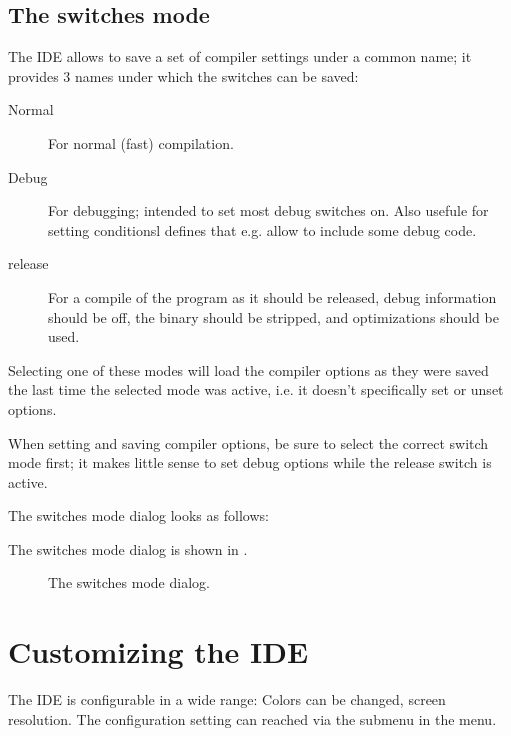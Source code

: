 \subsection{The switches mode}
\label{se:compilermode}
The IDE allows to save a set of compiler settings under a common name; it
provides 3 names under which the switches can be saved:
\begin{description}
\item[Normal] For normal (fast) compilation.
\item[Debug] For debugging; intended to set most debug switches on. Also
usefule for setting conditionsl defines that e.g. allow to include some
debug code.
\item[release] For a compile of the program as it should be released, debug
information should be off, the binary should be stripped, and optimizations
should be used.
\end{description}
Selecting one of these modes will load the compiler options as they were
saved the last time the selected mode was active, i.e. it doesn't
specifically set or unset options. 

When setting and saving compiler options, be sure to select the correct
switch mode first; it makes little sense to set debug options while the
release switch is active.

\begin{htmlonly}
The switches mode dialog looks as follows:
\end{htmlonly}
\begin{latexonly}
The switches mode dialog is shown in .
\begin{figure}[ht]
\begin{center}
\caption{The switches mode dialog.}\label{fig:oswitch}
\ifpdf
{}%
\else
{}%
\fi
\end{center}
\end{figure}
\end{latexonly}

\section{Customizing the IDE}
The IDE is configurable in a wide range: Colors can be changed, screen
resolution. The configuration setting can reached via the
submenu  in the  menu.
%
%
